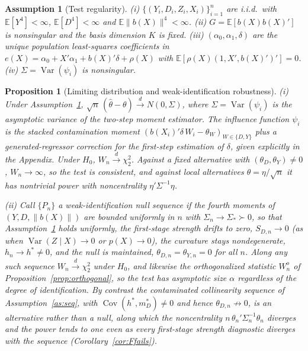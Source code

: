\documentclass[preprint,11pt,authoryear]{elsarticle}
\newtheorem{assumption}{Assumption}
\newtheorem{proposition}{Proposition}
\theoremstyle{definition}
\newcommand{\E}{\mathbb{E}}
\newcommand{\Cov}{\operatorname{Cov}}
\newcommand{\Var}{\operatorname{Var}}
\newcommand{\convd}{\overset{d}{\longrightarrow}}
\begin{document}
\begin{assumption}[Test regularity]\label{as:test}
(i) $\{(Y_i,D_i,Z_i,X_i)\}_{i=1}^n$ are i.i.d.\ with $\E[Y^4]<\infty$,
$\E[D^4]<\infty$ and $\E\|b(X)\|^4<\infty$. (ii) $G=\E[b(X)b(X)']$ is nonsingular
and the basis dimension $K$ is fixed. (iii) $(\alpha_0,\alpha_1,\delta)$ are the
unique population least-squares coefficients in
$e(X)=\alpha_0+X'\alpha_1+b(X)'\delta+\rho(X)$ with
$\E[\rho(X)(1,X',b(X)')']=0$. (iv) $\Sigma=\Var(\psi_i)$ is nonsingular.
\end{assumption}

\begin{proposition}[Limiting distribution and weak-identification robustness]\label{prop:test}
(i) Under Assumption~\ref{as:test},
$\sqrt n\,(\hat\theta-\theta)\convd N(0,\Sigma)$, where $\Sigma=\Var(\psi_i)$ is the
asymptotic variance of the two-step moment estimator. The influence function $\psi_i$
is the stacked contamination moment $(b(X_i)'\delta\,W_i-\theta_W)_{W\in\{D,Y\}}$ plus a
generated-regressor correction for the first-step estimation of $\delta$, given
explicitly in the Appendix. Under $H_0$, $W_n\convd \chi^2_2$. Against a fixed
alternative with $(\theta_D,\theta_Y)\neq0$, $W_n\to\infty$, so the test is consistent,
and against local alternatives $\theta=\eta/\sqrt n$ it has nontrivial power with
noncentrality $\eta'\Sigma^{-1}\eta$.

(ii) Call $\{P_n\}$ a \emph{weak-identification null sequence} if the fourth moments of
$(Y,D,\|b(X)\|)$ are bounded uniformly in $n$ with $\Sigma_n\to\Sigma_\ast\succ0$, so that
Assumption~\ref{as:test} holds uniformly, the first-stage strength drifts to zero,
$S_{D,n}\to0$ (as when $\Var(Z\mid X)\to0$ or $p(X)\to0$), the curvature stays
nondegenerate, $h_n\to h^\ast\neq0$, and the null is maintained,
$\theta_{D,n}=\theta_{Y,n}=0$ for all $n$. Along any such sequence $W_n\convd\chi^2_2$
under $H_0$, and likewise the orthogonalized statistic $W^o_n$ of
Proposition~\ref{prop:orthogonal}, so the test has asymptotic size $\alpha$ regardless of
the degree of identification. By contrast the contaminated collinearity sequence of
Assumption~\ref{as:seq}, with $\Cov(h^\ast,m_D^\ast)\neq0$ and hence
$\theta_{D,n}\not\to0$, is an \emph{alternative} rather than a null, along which the
noncentrality $n\,\theta_n'\Sigma_n^{-1}\theta_n$ diverges and the power tends to one even
as every first-stage strength diagnostic diverges with the sequence
(Corollary~\ref{cor:Ffails}).\label{prop:weakrobust}
\end{proposition}
\end{document}
